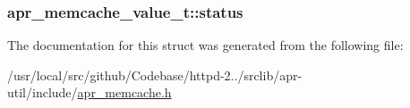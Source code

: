 \subsubsection[{\texorpdfstring{status}{status}}]{ apr\+\_\+memcache\+\_\+value\+\_\+t\+::status}\hypertarget{structapr__memcache__value__t_a02cb1c2f8e2ac25cd1ecfcb897f13b19}{}\label{structapr__memcache__value__t_a02cb1c2f8e2ac25cd1ecfcb897f13b19}


The documentation for this struct was generated from the following file\+:\begin{DoxyCompactItemize}
\item 
/usr/local/src/github/\+Codebase/httpd-\/2../srclib/apr-\/util/include/\hyperlink{apr__memcache_8h}{apr\+\_\+memcache.\+h}\end{DoxyCompactItemize}
